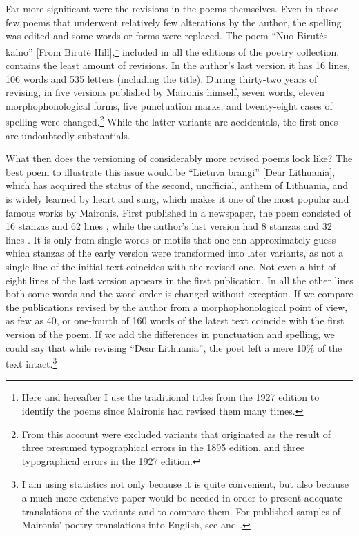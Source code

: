 \begin{paper}
Far more significant were the revisions in the poems themselves. Even in
those few poems that underwent relatively few alterations by the
author, the spelling was edited and some words or forms were
replaced. The poem ``Nuo Birutės kalno'' [From Birutė Hill],\footnote{Here
  and hereafter I use the traditional titles from the 1927 edition to
  identify the poems since Maironis had revised them many times.}
included in all the editions of the poetry collection, contains the
least amount of revisions. In the author's last version it has 16 lines,
106 words and 535 letters (including the title). During thirty-two years
of revising, in five versions published by Maironis himself, seven
words, eleven morphophonological forms, five punctuation marks, and
twenty-eight cases of spelling were changed.\footnote{From this account
  were excluded variants that originated as the result of three presumed
  typographical errors in the 1895 edition, and three typographical
  errors in the 1927 edition.} While the latter variants are accidentals, the
first ones are undoubtedly substantials.

What then does the versioning of considerably more revised poems look like?
The best poem to illustrate this issue would be ``Lietuva brangi'' [Dear
Lithuania], which has acquired the status of the second, unofficial,
anthem of Lithuania, and is widely learned by heart and sung, which
makes it one of the most popular and famous works by Maironis. First published in a newspaper, the poem consisted of 16 stanzas and 62 lines \citep{maironis_lietuvos_1891}, while the author's last version had 8 stanzas and 32
lines \citep[58--59]{maironis_maironio_1927}. It is only from single words or motifs
that one can approximately guess which stanzas of the early version were
transformed into later variants, as not a single line of the initial
text coincides with the revised one. Not even a hint of eight lines of
the last version appears in the first publication. In all the other
lines both some words and the word order is changed without exception.
If we compare the publications revised by the author from a morphophonological point of view, as few as 40, or one-fourth of 160 words of
the latest text coincide with the first version of the poem. If we add
the differences in punctuation and spelling, we could say that while
revising ``Dear Lithuania'', the poet left a mere 10\% of the text
intact.\footnote{I am using statistics not only because it is quite
  convenient, but also because a much more extensive paper would be needed
  in order to present adequate translations of the variants and to
  compare them. For published samples of Maironis' poetry translations into English, see \citealt{maironis_maironis_1963} and \citealt{maironis_maironis_2002}.}


\end{paper}
